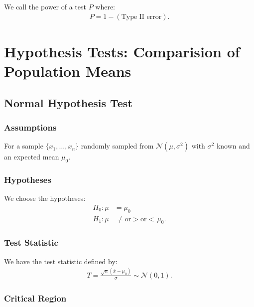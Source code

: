 \documentclass[a4paper, 12pt, twoside]{article}
\begin{document}
\vspace{\baselineskip}

We call the power of a test $P$ where:
\begin{align*}
    P = 1 - (\text{Type II error}).
\end{align*}

\newpage

\section{Hypothesis Tests: Comparision of Population Means}

\subsection{Normal Hypothesis Test}

\subsubsection{Assumptions}

For a sample $\{x_1, \ldots, x_n\}$ randomly sampled from
$\mathcal{N}(\mu, \sigma^2)$ with $\sigma^2$ known and an
expected mean $\mu_0$.

\subsubsection{Hypotheses}

We choose the hypotheses:
\begin{align*}
    H_0 : \mu & = \mu_0                                   \\
    H_1 : \mu & \, \neq \text{or} > \text{or} < \, \mu_0.
\end{align*}

\subsubsection{Test Statistic}

We have the test statistic defined by:
\begin{align*}
    T = \frac{\sqrt{n}(\overline{x} - \mu_0)}{\sigma}
    \sim \mathcal{N}(0, 1).
\end{align*}

\subsubsection{Critical Region}
\end{document}
